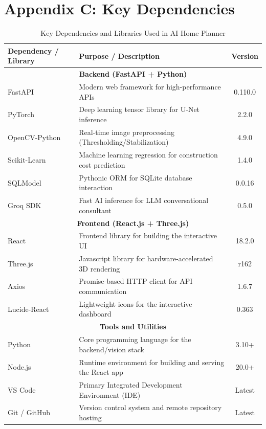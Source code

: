 \documentclass[12pt]{report}
\begin{document}
\section*{Appendix C: Key Dependencies}

\begin{table}[H]
\centering
\caption{Key Dependencies and Libraries Used in AI Home Planner}
\label{tab:key_dependencies}
\begin{tabular}{|l|l|c|}
\hline
\textbf{Dependency / Library} & \textbf{Purpose / Description} & \textbf{Version} \\
\hline
\multicolumn{3}{|c|}{\textbf{Backend (FastAPI + Python)}} \\
\hline
FastAPI\cite{fastapi2024} & Modern web framework for high-performance APIs & 0.110.0 \\
\hline
PyTorch\cite{pytorch2024} & Deep learning tensor library for U-Net inference & 2.2.0 \\
\hline
OpenCV-Python\cite{opencv2024} & Real-time image preprocessing (Thresholding/Stabilization) & 4.9.0 \\
\hline
Scikit-Learn\cite{sklearn2024} & Machine learning regression for construction cost prediction & 1.4.0 \\
\hline
SQLModel & Pythonic ORM for SQLite database interaction & 0.0.16 \\
\hline
Groq SDK\cite{groq2024} & Fast AI inference for LLM conversational consultant & 0.5.0 \\
\hline
\multicolumn{3}{|c|}{\textbf{Frontend (React.js + Three.js)}} \\
\hline
React & Frontend library for building the interactive UI & 18.2.0 \\
\hline
Three.js\cite{threejs2024} & Javascript library for hardware-accelerated 3D rendering & r162 \\
\hline
Axios & Promise-based HTTP client for API communication & 1.6.7 \\
\hline
Lucide-React & Lightweight icons for the interactive dashboard & 0.363 \\
\hline
\multicolumn{3}{|c|}{\textbf{Tools and Utilities}} \\
\hline
Python & Core programming language for the backend/vision stack & 3.10+ \\
\hline
Node.js & Runtime environment for building and serving the React app & 20.0+ \\
\hline
VS Code & Primary Integrated Development Environment (IDE) & Latest \\
\hline
Git / GitHub & Version control system and remote repository hosting & Latest \\
\hline
\end{tabular}
\end{table}
\end{document}
